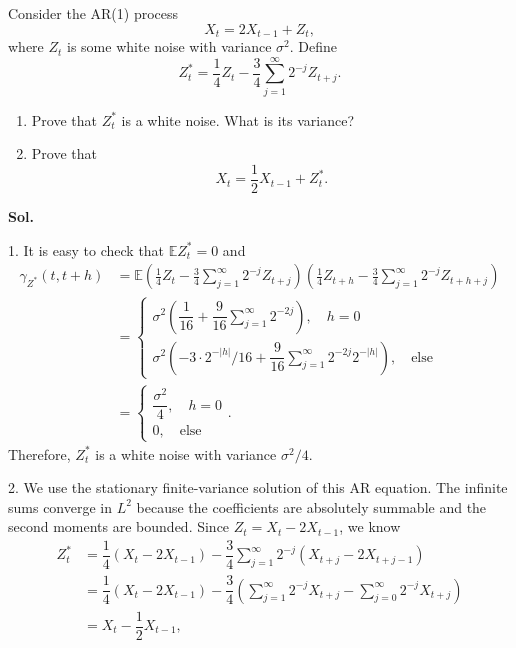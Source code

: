 \documentclass[lang=en,11pt,a4paper,citestyle =authoryear]{elegantpaper}
\begin{document}
Consider the AR(1) process
\[
X_t=2X_{t-1}+Z_t,
\]
where $Z_t$ is some white noise with variance $\sigma^2$. Define
\[
Z_t^*
=\frac{1}{4}Z_t
-\frac{3}{4}\sum_{j=1}^{\infty}2^{-j}Z_{t+j}.
\]
\begin{enumerate}[label=\arabic*.]
    \item
    Prove that $Z_t^*$ is a white noise. What is its variance?

    \item
    Prove that
    \[
    X_t=\frac{1}{2}X_{t-1}+Z_t^*.
    \]
\end{enumerate}
\vspace{0.5em}
\textbf{Sol.} \par
1. It is easy to check that $\mathbb{E}Z_t^* = 0$ and
\[
\begin{aligned}
    \gamma_{Z^*}(t,t+h) &= \mathbb{E}\left(\frac{1}{4}Z_t
-\frac{3}{4}\sum_{j=1}^{\infty}2^{-j}Z_{t+j}\right) \left(\frac{1}{4}Z_{t+h}
-\frac{3}{4}\sum_{j=1}^{\infty}2^{-j}Z_{t+h+j}\right) \\
&=\begin{cases}
    \sigma^2\left(\dfrac{1}{16} + \dfrac{9}{16}\sum\limits_{j=1}^{\infty} 2^{-2j}\right), \quad h = 0 \\
    \sigma^2\left(-3\cdot 2^{-|h|}/16 + \dfrac{9}{16} \sum\limits_{j=1}^{\infty}2^{-2j}2^{-|h|}\right),\quad\text{else}
\end{cases} \\
&=\begin{cases}
    \dfrac{\sigma^2}{4},\quad h=0 \\
    0,\quad\text{else}
\end{cases}.
\end{aligned}
\]
Therefore, $Z_t^*$ is a white noise with variance $\sigma^2/4$.\par
2. We use the stationary finite-variance solution of this AR equation.
The infinite sums converge in $L^2$ because the coefficients are absolutely
summable and the second moments are bounded. Since $Z_t=X_t-2X_{t-1}$, we know
\[
\begin{aligned}
    Z_t^* &= \dfrac{1}{4}(X_t- 2 X_{t-1}) - \dfrac{3}{4}\sum\limits_{j=1}^{\infty}2^{-j}(X_{t+j}- 2 X_{t+j-1}) \\
    &= \dfrac{1}{4}(X_t- 2 X_{t-1}) - \dfrac{3}{4}\left(\sum\limits_{j=1}^{\infty}2^{-j} X_{t+j} - \sum\limits_{j=0}^{\infty}2^{-j} X_{t+j}\right) \\
    & = X_t - \dfrac{1}{2}X_{t-1},
\end{aligned}
\]
\par 
\vspace{0.5em}
\end{document}
